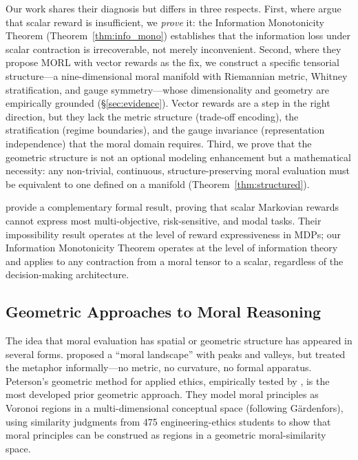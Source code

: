 \documentclass[12pt]{article}
\theoremstyle{definition}
\theoremstyle{remark}
\begin{document}
Our work shares their diagnosis but differs in three respects. First, where \citeauthor{vamplew2022} argue that scalar reward is insufficient, we \emph{prove} it: the Information Monotonicity Theorem (Theorem~\ref{thm:info_mono}) establishes that the information loss under scalar contraction is irrecoverable, not merely inconvenient. Second, where they propose MORL with vector rewards as the fix, we construct a specific tensorial structure---a nine-dimensional moral manifold with Riemannian metric, Whitney stratification, and gauge symmetry---whose dimensionality and geometry are empirically grounded (\S\ref{sec:evidence}). Vector rewards are a step in the right direction, but they lack the metric structure (trade-off encoding), the stratification (regime boundaries), and the gauge invariance (representation independence) that the moral domain requires. Third, we prove that the geometric structure is not an optional modeling enhancement but a mathematical necessity: any non-trivial, continuous, structure-preserving moral evaluation must be equivalent to one defined on a manifold (Theorem~\ref{thm:structured}).

\citet{skalse2023} provide a complementary formal result, proving that scalar Markovian rewards cannot express most multi-objective, risk-sensitive, and modal tasks. Their impossibility result operates at the level of reward expressiveness in MDPs; our Information Monotonicity Theorem operates at the level of information theory and applies to any contraction from a moral tensor to a scalar, regardless of the decision-making architecture.

\subsection{Geometric Approaches to Moral Reasoning}

The idea that moral evaluation has spatial or geometric structure has appeared in several forms. \citet{harris2010} proposed a ``moral landscape'' with peaks and valleys, but treated the metaphor informally---no metric, no curvature, no formal apparatus. Peterson's geometric method for applied ethics, empirically tested by \citet{verheyen2020}, is the most developed prior geometric approach. They model moral principles as Voronoi regions in a multi-dimensional conceptual space (following G\"{a}rdenfors), using similarity judgments from 475 engineering-ethics students to show that moral principles can be construed as regions in a geometric moral-similarity space.
\end{document}
